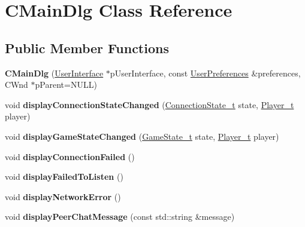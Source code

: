 \hypertarget{classCMainDlg}{
\section{CMainDlg Class Reference}
\label{classCMainDlg}
}
\subsection*{Public Member Functions}
\begin{DoxyCompactItemize}
\item 
\hypertarget{classCMainDlg_a3d1855c88836a3f933555d4ef350412b}{
{\bfseries CMainDlg} (\hyperlink{classUserInterface}{UserInterface} $\ast$pUserInterface, const \hyperlink{structUserPreferences}{UserPreferences} \&preferences, CWnd $\ast$pParent=NULL)}
\label{classCMainDlg_a3d1855c88836a3f933555d4ef350412b}

\item 
\hypertarget{classCMainDlg_a4f3d053547e8dd3ee376747a5899c80f}{
void {\bfseries displayConnectionStateChanged} (\hyperlink{namespaceConnectionState_ad1b6674b6f1c58f17e9db75d0a77149f}{ConnectionState\_\-t} state, \hyperlink{namespacePlayer_acc4ced29e6b7e20f602b3c8b60c75228}{Player\_\-t} player)}
\label{classCMainDlg_a4f3d053547e8dd3ee376747a5899c80f}

\item 
\hypertarget{classCMainDlg_af52a54b8267d1aed20a8a7cf68af0eca}{
void {\bfseries displayGameStateChanged} (\hyperlink{namespaceGameState_a1026e99904938017415f188e2daba514}{GameState\_\-t} state, \hyperlink{namespacePlayer_acc4ced29e6b7e20f602b3c8b60c75228}{Player\_\-t} player)}
\label{classCMainDlg_af52a54b8267d1aed20a8a7cf68af0eca}

\item 
\hypertarget{classCMainDlg_a0ed46cba2e44554234ee991f8c3ece30}{
void {\bfseries displayConnectionFailed} ()}
\label{classCMainDlg_a0ed46cba2e44554234ee991f8c3ece30}

\item 
\hypertarget{classCMainDlg_a8d6808eaab0ee11cde45362ffadef5ec}{
void {\bfseries displayFailedToListen} ()}
\label{classCMainDlg_a8d6808eaab0ee11cde45362ffadef5ec}

\item 
\hypertarget{classCMainDlg_ae514375b2047fef42542152203a69391}{
void {\bfseries displayNetworkError} ()}
\label{classCMainDlg_ae514375b2047fef42542152203a69391}

\item 
\hypertarget{classCMainDlg_a2afd2d4afae59cd06054e69f97fb3279}{
void {\bfseries displayPeerChatMessage} (const std::string \&message)}
\label{classCMainDlg_a2afd2d4afae59cd06054e69f97fb3279}


\end{DoxyCompactItemize}
